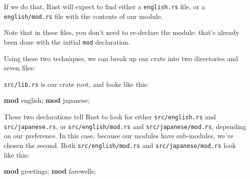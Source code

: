 \documentclass[a4paper,]{book}
\newenvironment{Shaded}{\begin{snugshade}}{\end{snugshade}}
\newcommand{\KeywordTok}[1]{\textcolor[rgb]{0.13,0.29,0.53}{\textbf{{#1}}}}
\newcommand{\NormalTok}[1]{{#1}}
\begin{document}
If we do that, Rust will expect to find either a \texttt{english.rs}
file, or a \texttt{english/mod.rs} file with the contents of our module.

Note that in these files, you don't need to re-declare the module:
that's already been done with the initial \texttt{mod} declaration.

Using these two techniques, we can break up our crate into two
directories and seven files:

\begin{Shaded}
\end{Shaded}

\texttt{src/lib.rs} is our crate root, and looks like this:

\begin{Shaded}
\begin{Highlighting}[]
\KeywordTok{mod} \NormalTok{english;}
\KeywordTok{mod} \NormalTok{japanese;}
\end{Highlighting}
\end{Shaded}

These two declarations tell Rust to look for either
\texttt{src/english.rs} and \texttt{src/japanese.rs}, or
\texttt{src/english/mod.rs} and \texttt{src/japanese/mod.rs}, depending
on our preference. In this case, because our modules have sub-modules,
we've chosen the second. Both \texttt{src/english/mod.rs} and
\texttt{src/japanese/mod.rs} look like this:

\begin{Shaded}
\begin{Highlighting}[]
\KeywordTok{mod} \NormalTok{greetings;}
\KeywordTok{mod} \NormalTok{farewells;}
\end{Highlighting}
\end{Shaded}
\end{document}
